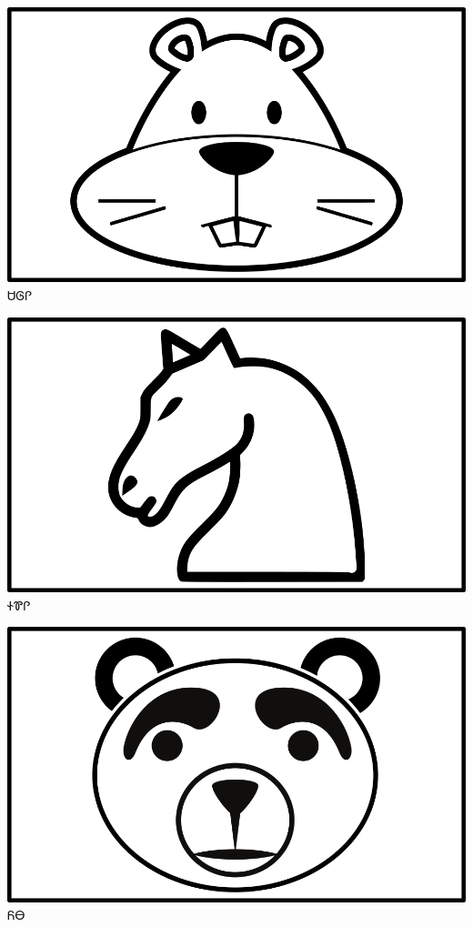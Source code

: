 \documentclass[avery5371]{flashcards}%
\begin{document}
    \begin{flashcard}{
        \includegraphics[width=0.95\columnwidth,height=.51\columnwidth,keepaspectratio]{../artwork/objects-animate/saloli}
    }
        \Huge ᏌᎶᎵ
    \end{flashcard}

    \begin{flashcard}{
        \includegraphics[width=0.95\columnwidth,height=.51\columnwidth,keepaspectratio]{../artwork/objects-animate/soquili}
    }
        \Huge ᏐᏈᎵ
    \end{flashcard}

    \begin{flashcard}{
        \includegraphics[width=0.95\columnwidth,height=.51\columnwidth,keepaspectratio]{../artwork/objects-animate/yona}
    }
        \Huge ᏲᎾ
    \end{flashcard}
\end{document}
